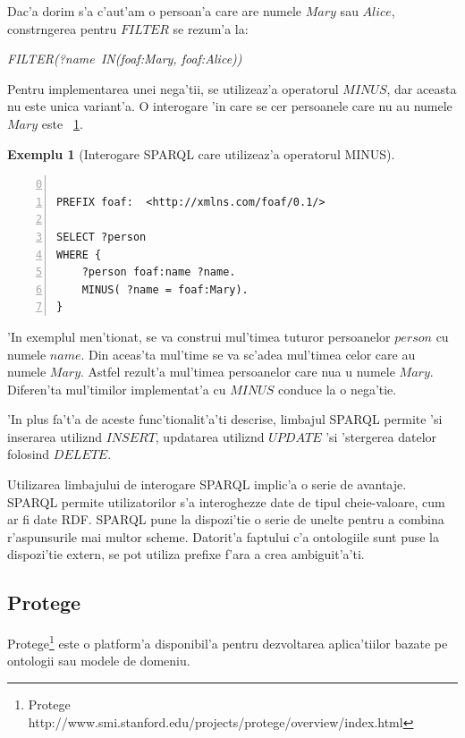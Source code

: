 \documentclass[12pt,a4paper,twoside]{report}
\newtheorem{example}{Exemplu}
\begin{document}
Dac'a dorim s'a c'aut'am o persoan'a care are numele $Mary$ sau $Alice$, constr\ia ngerea pentru $FILTER$ se rezum'a la:
\begin{center}
{\it FILTER(?name\ IN(foaf:Mary, foaf:Alice))}
\end{center} 

Pentru implementarea unei nega'tii, se utilizeaz'a operatorul $MINUS$, dar aceasta nu este unica variant'a. O interogare 'in care se cer persoanele care nu au numele $Mary$ este ~\ref{ex:ex_minus}.

\begin{example}[Interogare SPARQL care utilizeaz'a operatorul MINUS]
\begin{lstlisting}[basicstyle=\footnotesize, numbers=left, firstnumber = 0]

PREFIX foaf:  <http://xmlns.com/foaf/0.1/>

SELECT ?person
WHERE {
    ?person foaf:name ?name.
    MINUS( ?name = foaf:Mary).
} 
\end{lstlisting}
\label{ex:ex_minus}
\end{example}

'In exemplul men'tionat, se va construi mul'timea tuturor persoanelor $person$ cu numele $name$. Din aceas'ta mul'time se va sc'adea mul'timea celor care au numele $Mary$. Astfel rezult'a mul'timea persoanelor care nua u numele $Mary$. Diferen'ta mul'timilor implementat'a cu $MINUS$ conduce la o nega'tie.

'In plus fa't'a de aceste func'tionalit'a'ti descrise, limbajul SPARQL permite 'si inserarea utiliz\ia nd $INSERT$, updatarea utiliz\ia nd $UPDATE$ 'si 'stergerea datelor folosind $DELETE$.

Utilizarea limbajului de interogare SPARQL implic'a o serie de avantaje. SPARQL permite utilizatorilor s'a interoghezze date de tipul cheie-valoare, cum ar fi date RDF. SPARQL pune la dispozi'tie o serie de unelte pentru a combina r'aspunsurile mai multor scheme. Datorit'a faptului c'a ontologiile sunt puse la dispozi'tie extern, se pot utiliza prefixe f'ara a crea ambiguit'a'ti.

\subsection{Protege}
Protege\footnote{Protege http://www.smi.stanford.edu/projects/protege/overview/index.html} este o platform'a disponibil'a pentru dezvoltarea aplica'tiilor bazate pe ontologii sau modele de domeniu. 
\end{document}
